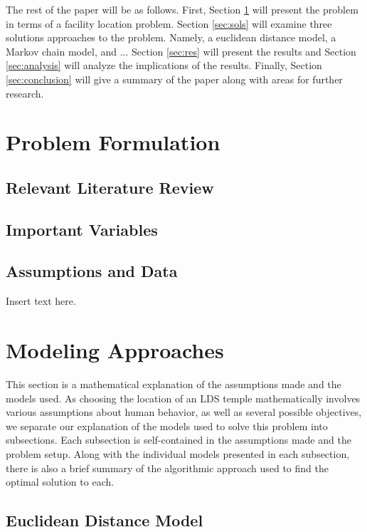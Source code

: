 \documentclass[twoside,twocolumn]{article}
\begin{document}
The rest of the paper will be as follows.
First, Section \ref{sec:prob} will present the problem in terms of a facility location problem.
Section \ref{sec:sols} will examine three solutions approaches to the problem.
Namely, a euclidean distance model, a Markov chain model, and ... %
Section \ref{sec:res} will present the results and Section \ref{sec:analysis} will analyze the implications of the results.
Finally, Section \ref{sec:conclusion} will give a summary of the paper along with areas for further research.

\section{Problem Formulation}
\label{sec:prob}
\subsection{Relevant Literature Review}
\subsection{Important Variables}
\subsection{Assumptions and Data}

Insert text here.

\section{Modeling Approaches}
\label{sec:models}
This section is a mathematical explanation of the assumptions made and the models used. As choosing the location of an LDS temple mathematically involves various assumptions about human behavior, as well as several possible objectives, we separate our explanation of the models used to solve this problem into subsections. Each subsection is self-contained in the assumptions made and the problem setup. Along with the individual models presented in each subsection, there is also a brief summary of the algorithmic approach used to find the optimal solution to each.

\subsection{Euclidean Distance Model} %
\end{document}

